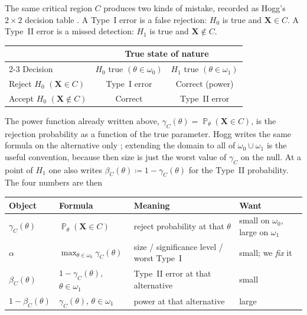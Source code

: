 \documentclass[11pt,a4paper]{article}
\DeclareMathOperator{\Pbb}{\mathbb{P}}
\begin{document}
\begin{remark}
\label{rem:type-i-ii-power}
The same critical region \(C\) produces two kinds of mistake, recorded as Hogg's \(2\times 2\) decision table \citep[Table~4.5.1]{hogg2019}. A Type~I error is a false rejection: \(H_0\) is true and \(\mathbf{X}\in C\). A Type~II error is a missed detection: \(H_1\) is true and \(\mathbf{X}\notin C\).

\begin{center}
\renewcommand{\arraystretch}{1.28}
\begin{tabular}{@{}lcc@{}}
\toprule
 & \multicolumn{2}{c}{True state of nature} \\
\cmidrule(lr){2-3}
Decision & \(H_0\) true \((\theta\in\omega_0)\) & \(H_1\) true \((\theta\in\omega_1)\) \\
\midrule
Reject \(H_0\) \((\mathbf{X}\in C)\)
  & Type~I error
  & Correct (power) \\
Accept \(H_0\) \((\mathbf{X}\notin C)\)
  & Correct
  & Type~II error \\
\bottomrule
\end{tabular}
\end{center}

The power function already written above, \(\gamma_C(\theta)=\Pbb_{\theta}(\mathbf{X}\in C)\), is the rejection probability as a function of the true parameter. Hogg writes the same formula on the alternative only \citep[(4.5.5), (8.1.4)]{hogg2019}; extending the domain to all of \(\omega_0\cup\omega_1\) is the useful convention, because then size is just the worst value of \(\gamma_C\) on the null. At a point of \(H_1\) one also writes \(\beta_C(\theta)\coloneqq 1-\gamma_C(\theta)\) for the Type~II probability. The four numbers are then

\begin{center}
\renewcommand{\arraystretch}{1.32}
\begin{tabular}{@{}llll@{}}
\toprule
Object & Formula & Meaning & Want \\
\midrule
\(\gamma_C(\theta)\)
  & \(\Pbb_{\theta}(\mathbf{X}\in C)\)
  & reject probability at that \(\theta\)
  & small on \(\omega_0\), large on \(\omega_1\) \\
\(\alpha\)
  & \(\max_{\theta\in\omega_0}\gamma_C(\theta)\)
  & size / significance level / worst Type~I
  & small; we \emph{fix} it \\
\(\beta_C(\theta)\)
  & \(1-\gamma_C(\theta)\), \(\theta\in\omega_1\)
  & Type~II error at that alternative
  & small \\
\(1-\beta_C(\theta)\)
  & \(\gamma_C(\theta)\), \(\theta\in\omega_1\)
  & power at that alternative
  & large \\
\bottomrule
\end{tabular}
\end{center}


\end{remark}
\end{document}
